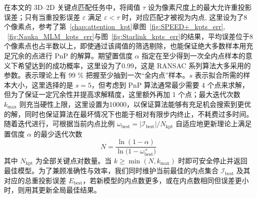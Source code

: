 在本文的 3D–2D 关键点匹配任务中，将阈值 $\tau$ 设为像素尺度上的最大允许重投影误差；只有当重投影误差 $\varepsilon$ 满足 $\varepsilon<\tau$ 时，对应匹配才被视为内点, 这里设为了8个像素点，参考了第~\ref{chap:attention_kpt}章图~\ref{fig:SPEED+_kpts_err}, ~\ref{fig:Nauka_MLM_kpts_err}与图~\ref{fig:Starlink_kpts_err}的结果，平均误差位于8个像素点也占半数以上，即使通过该阈值的筛选剔除，也能保证绝大多数样本用充足冗余的点进行 PnP 的解算。期望置信度 $\alpha$ 指定在至少得到一次全内点样本的意义下希望达到的成功概率，这里设为了0.99，这是 RANSAC 系列算法大多采用的参数\cite{9399280, riu2022automatic}。表示理论上有 99 \% 把握至少抽到一次“全内点”样本。$s$ 表示拟合所需的样本大小，这里选择的是 $s=5$，但考虑到 PnP 算法通常最少需要 4 个点来求解，但为了保证一定冗余性并提高求解精度，这里额外再加 1 个点；最大迭代次数 $k_{\max}$ 则充当硬性上限，这里设置为10000，以保证算法能够有充足机会搜索到更优的解，同时也保证算法在最坏情况下也能于相对有限步内终止，不耗费过多时间。随着迭代进行，可根据当前内点比例 $\omega_{\text{best}}=\lvert\mathcal{I}_{\text{best}}\rvert/N_{\text{kpt}}$ 自适应地更新理论上满足置信度 $\alpha$ 的最少迭代次数
\begin{equation}
	N=\frac{\ln(1-\alpha)}{\ln\!\bigl(1-\omega_{\text{best}}^{\,s}\bigr)}
\end{equation}
其中 $N_{\text{kpt}}$ 为全部关键点对数量。当 $k\ge\min(N,k_{\max})$ 时即可安全停止并返回最佳模型。为了兼顾准确性与效率，我们同时维护当前最佳的内点集合 $\mathcal{I}_{\text{best}}$ 及其对应的总重投影误差 $E_{\text{best}}$，若新模型的内点数更多，或在内点数相同但误差更小时，则用其更新全局最佳结果。

